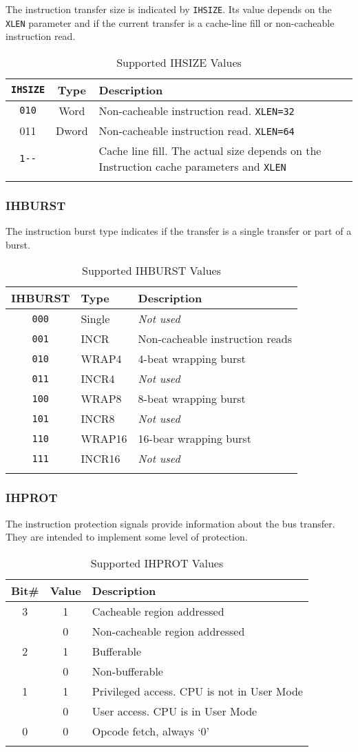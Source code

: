 The instruction transfer size is indicated by \texttt{IHSIZE}. Its value depends
on the \texttt{XLEN} parameter and if the current transfer is a cache-line fill
or non-cacheable instruction read.

\begin{longtable}[]{@{}ccl@{}}
\toprule
\texttt{IHSIZE} & Type & Description\tabularnewline
\midrule
\endhead
\texttt{010} & Word & Non-cacheable instruction read. \texttt{XLEN=32}\tabularnewline
011 & Dword & Non-cacheable instruction read. \texttt{XLEN=64}\tabularnewline
\texttt{1-\/-} & & Cache line fill. The actual size depends on the Instruction
cache parameters and \texttt{XLEN}\tabularnewline
\bottomrule
\caption{Supported IHSIZE Values}
\end{longtable}

\subsubsection{IHBURST}\label{ihburst}

The instruction burst type indicates if the transfer is a single
transfer or part of a burst.

\begin{longtable}[]{@{}cll@{}}
\toprule
IHBURST & Type & Description\tabularnewline
\midrule
\endhead
\texttt{000} & Single & \emph{Not used}\tabularnewline
\texttt{001} & INCR & Non-cacheable instruction reads\tabularnewline
\texttt{010} & WRAP4 & 4-beat wrapping burst\tabularnewline
\texttt{011} & INCR4 & \emph{Not used}\tabularnewline
\texttt{100} & WRAP8 & 8-beat wrapping burst\tabularnewline
\texttt{101} & INCR8 & \emph{Not used}\tabularnewline
\texttt{110} & WRAP16 & 16-bear wrapping burst\tabularnewline
\texttt{111} & INCR16 & \emph{Not used}\tabularnewline
\bottomrule
\caption{Supported IHBURST Values}
\end{longtable}

\subsubsection{IHPROT}\label{ihprot}

The instruction protection signals provide information about the bus
transfer. They are intended to implement some level of protection.

\begin{longtable}[]{@{}ccl@{}}
\toprule
Bit\# & Value & Description\tabularnewline
\midrule
\endhead
3 & 1 & Cacheable region addressed\tabularnewline
& 0 & Non-cacheable region addressed\tabularnewline
2 & 1 & Bufferable\tabularnewline
& 0 & Non-bufferable\tabularnewline
1 & 1 & Privileged access. CPU is not in User Mode\tabularnewline
& 0 & User access. CPU is in User Mode\tabularnewline
0 & 0 & Opcode fetch, always `0'\tabularnewline
\bottomrule
\caption{Supported IHPROT Values}
\end{longtable}


